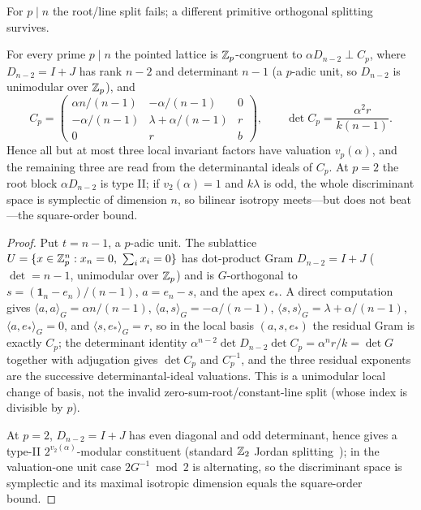 For $p\mid n$ the root/line split fails; a different primitive orthogonal
splitting survives.

\begin{theorem}\label{thm:xd}
For every prime $p\mid n$ the pointed lattice is $\mathbb{Z}_p$-congruent to
$\alpha D_{n-2}\perp C_p$, where $D_{n-2}=I+J$ has rank $n-2$ and determinant
$n-1$ (a $p$-adic unit, so $D_{n-2}$ is unimodular over $\mathbb{Z}_p$), and
\[
C_p=\begin{pmatrix}\alpha n/(n-1)&-\alpha/(n-1)&0\\
-\alpha/(n-1)&\lambda+\alpha/(n-1)&r\\ 0&r&b\end{pmatrix},\qquad
\det C_p=\frac{\alpha^{2}r}{k(n-1)} .
\]
Hence all but at most three local invariant factors have valuation
$v_p(\alpha)$, and the remaining three are read from the determinantal ideals of
$C_p$. At $p=2$ the root block $\alpha D_{n-2}$ is type II; if $v_2(\alpha)=1$
and $k\lambda$ is odd, the whole discriminant space is symplectic of dimension
$n$, so bilinear isotropy meets---but does not beat---the square-order bound.
\end{theorem}

\begin{proof}
Put $t=n-1$, a $p$-adic unit. The sublattice
$U=\{x\in\mathbb{Z}_p^{n}:x_n=0,\ \sum_i x_i=0\}$ has dot-product Gram $D_{n-2}=I+J$
($\det=n-1$, unimodular over $\mathbb{Z}_p$) and is $G$-orthogonal to
$s=(\mathbf 1_n-e_n)/(n-1)$, $a=e_n-s$, and the apex $e_*$. A direct computation
gives $\langle a,a\rangle_G=\alpha n/(n-1)$, $\langle a,s\rangle_G=-\alpha/(n-1)$,
$\langle s,s\rangle_G=\lambda+\alpha/(n-1)$, $\langle a,e_*\rangle_G=0$, and
$\langle s,e_*\rangle_G=r$, so in the local basis
$(a,s,e_*)$ the residual Gram is exactly $C_p$; the determinant identity
$\alpha^{n-2}\det D_{n-2}\det C_p=\alpha^{n}r/k=\det G$ together with adjugation
gives $\det C_p$ and $C_p^{-1}$, and the three residual exponents are the
successive determinantal-ideal valuations. This is a unimodular local change of
basis, not the invalid zero-sum-root/constant-line split (whose index is
divisible by $p$).

At $p=2$, $D_{n-2}=I+J$ has even diagonal and odd determinant,
hence gives a type-II $2^{v_2(\alpha)}$-modular constituent (standard $\mathbb{Z}_2$
Jordan splitting~\cite{ConwaySloane}); in the valuation-one unit case
$2G^{-1}\bmod2$ is alternating, so the discriminant space is symplectic and its
maximal isotropic dimension equals the square-order bound.
\end{proof}

